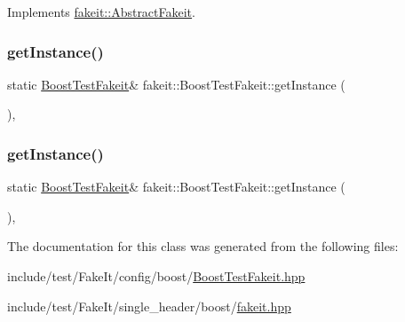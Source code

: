 Implements \mbox{\hyperlink{classfakeit_1_1AbstractFakeit_a9476180a503524d49d1978fbbc125b01}{fakeit\+::\+Abstract\+Fakeit}}.

\mbox{\label{classfakeit_1_1BoostTestFakeit_a1c311dab079fc7d816c747a696dd98a8}} 
\subsubsection{\texorpdfstring{getInstance()}{getInstance()}\hspace{0.1cm}{\footnotesize\ttfamily [1/2]}}
{\footnotesize\ttfamily static \mbox{\hyperlink{classfakeit_1_1BoostTestFakeit}{Boost\+Test\+Fakeit}}\& fakeit\+::\+Boost\+Test\+Fakeit\+::get\+Instance (\begin{DoxyParamCaption}{ }\end{DoxyParamCaption})\hspace{0.3cm}{\ttfamily [inline]}, {\ttfamily [static]}}

\mbox{\label{classfakeit_1_1BoostTestFakeit_a1c311dab079fc7d816c747a696dd98a8}} 
\subsubsection{\texorpdfstring{getInstance()}{getInstance()}\hspace{0.1cm}{\footnotesize\ttfamily [2/2]}}
{\footnotesize\ttfamily static \mbox{\hyperlink{classfakeit_1_1BoostTestFakeit}{Boost\+Test\+Fakeit}}\& fakeit\+::\+Boost\+Test\+Fakeit\+::get\+Instance (\begin{DoxyParamCaption}{ }\end{DoxyParamCaption})\hspace{0.3cm}{\ttfamily [inline]}, {\ttfamily [static]}}



The documentation for this class was generated from the following files\+:\begin{DoxyCompactItemize}
\item 
include/test/\+Fake\+It/config/boost/\mbox{\hyperlink{BoostTestFakeit_8hpp}{Boost\+Test\+Fakeit.\+hpp}}\item 
include/test/\+Fake\+It/single\+\_\+header/boost/\mbox{\hyperlink{single__header_2boost_2fakeit_8hpp}{fakeit.\+hpp}}\end{DoxyCompactItemize}
